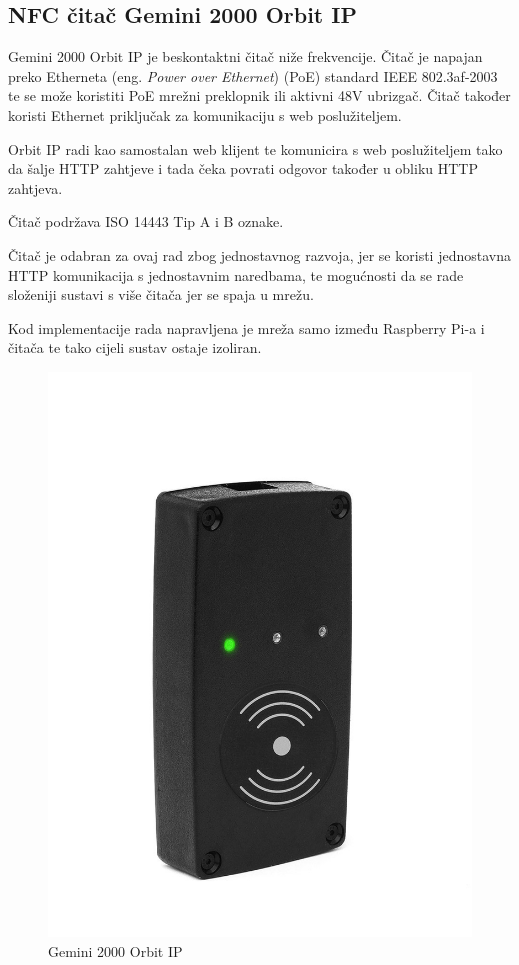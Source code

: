 \documentclass[times, utf8, zavrsni]{fer}
\begin{document}
\subsection{NFC čitač Gemini 2000 Orbit IP}
Gemini 2000 Orbit IP \citep{11} je beskontaktni čitač niže frekvencije. Čitač je napajan preko Etherneta (eng. \textit{Power over Ethernet}) (PoE) standard IEEE 802.3af-2003 te se može koristiti PoE mrežni preklopnik ili aktivni 48V ubrizgač. Čitač također koristi Ethernet priključak za komunikaciju s web poslužiteljem. \par
Orbit IP radi kao samostalan web klijent te komunicira s web poslužiteljem tako da šalje HTTP zahtjeve i tada čeka povrati odgovor također u obliku HTTP zahtjeva. \par 
Čitač podržava ISO 14443 Tip A i B oznake.\par 
Čitač je odabran za ovaj rad zbog jednostavnog razvoja, jer se koristi jednostavna HTTP komunikacija s jednostavnim naredbama, te mogućnosti da se rade složeniji sustavi s više čitača jer se spaja u mrežu.\par
Kod implementacije rada napravljena je mreža samo između Raspberry Pi-a i čitača te tako cijeli sustav ostaje izoliran.


\begin{figure}[H]
\includegraphics[scale=0.2]{orbit.jpg}
\centering
\caption{Gemini 2000 Orbit IP \citep{16}}
\centering
\end{figure}
\end{document}
